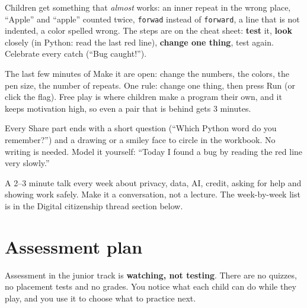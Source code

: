 \documentclass[track=junior,level=3,teacher]{kidscode}
\begin{document}
\begin{bughunt}
Children get something that \emph{almost} works: an inner repeat in the wrong place, \enquote{Apple}
and \enquote{apple} counted twice, \texttt{forwad} instead of \texttt{forward}, a line that is not
indented, a color spelled wrong. The steps are on the cheat sheet: \textbf{test} it, \textbf{look}
closely (in Python: read the last red line), \textbf{change one thing}, test again.
Celebrate every catch (\enquote{Bug caught!}).
\end{bughunt}

\begin{freebuild}
The last few minutes of Make it are open: change the numbers, the colors, the pen size, the number of
repeats. One rule: change one thing, then press Run (or click the flag). Free play is where children
make a program their own, and it keeps motivation high, so even a pair that is behind gets 3 minutes.
\end{freebuild}

\begin{reflection}
Every Share part ends with a short question (\enquote{Which Python word do you remember?}) and a
drawing or a smiley face to circle in the workbook. No writing is needed. Model it yourself:
\enquote{Today I found a bug by reading the red line very slowly.}
\end{reflection}

\begin{safety}
A 2--3 minute talk every week about privacy, data, AI, credit, asking for help and showing work
safely. Make it a conversation, not a lecture. The week-by-week list is in the Digital citizenship
thread section below.
\end{safety}

\section{Assessment plan}
Assessment in the junior track is \textbf{watching, not testing}. There are no quizzes, no
placement tests and no grades. You notice what each child can do while they play, and you use it
to choose what to practice next.
\end{document}
